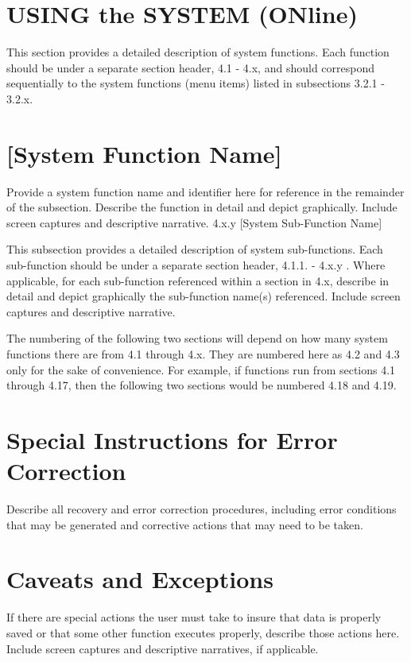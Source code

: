 \documentclass[10pt,letterpaper,extrafontsizes]{memoir}
\begin{document}
\section{USING the SYSTEM (ONline)}

This section provides a detailed description of system functions.  Each function should be under a separate section header, 4.1 - 4.x, and should correspond sequentially to the system functions (menu items) listed in subsections 3.2.1 - 3.2.x.
\section{[System Function Name]}

Provide a system function name and identifier here for reference in the remainder of the subsection.  Describe the function in detail and depict graphically.  Include screen captures and descriptive narrative.
4.x.y	[System Sub-Function Name]

This subsection provides a detailed description of system sub-functions.  Each sub-function should be under a separate section header, 4.1.1. - 4.x.y .  Where applicable, for each sub-function referenced within a section in 4.x, describe in detail and depict graphically the sub-function name(s) referenced.  Include screen captures and descriptive narrative.

The numbering of the following two sections will depend on how many system functions there are from 4.1 through 4.x.  They are numbered here as 4.2 and 4.3 only for the sake of convenience.  For example, if  functions run from sections 4.1 through 4.17, then the following two sections would be numbered 4.18 and 4.19.
\section{Special Instructions for Error Correction}

Describe all recovery and error correction procedures, including error conditions that may be generated and corrective actions that may need to be taken.
\section{Caveats and Exceptions}

If there are special actions the user must take to insure that data is properly saved or that some other function executes properly, describe those actions here.  Include screen captures and descriptive narratives, if applicable.
\end{document}
